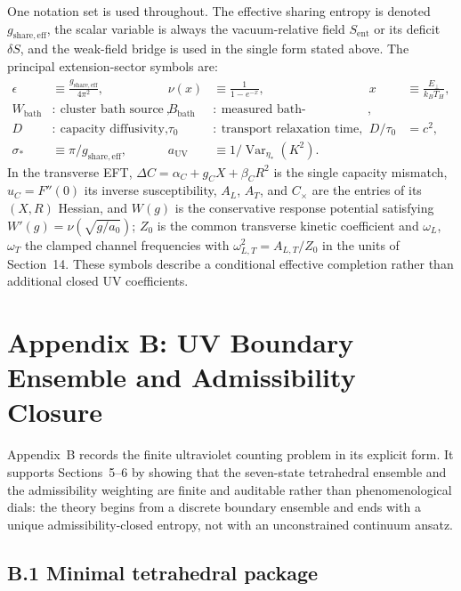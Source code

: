 \documentclass[11pt]{article}
\begin{document}
One notation set is used throughout. The effective sharing entropy is denoted $g_{\mathrm{share,eff}}$, the scalar variable is always the vacuum-relative field $S_{\mathrm{ent}}$ or its deficit $\delta S$, and the weak-field bridge is used in the single form stated above. The principal extension-sector symbols are:
\begin{align*}
\epsilon&\equiv \frac{g_{\mathrm{share,eff}}}{4\pi^2},
&\nu(x)&\equiv \frac{1}{1-e^{-x}},
&x&\equiv \frac{E_\perp}{k_BT_H},\\
W_{\mathrm{bath}}&:\ \text{cluster bath source weight},
&B_{\mathrm{bath}}&:\ \text{measured bath-development fraction},\\
D&:\ \text{capacity diffusivity},
&\tau_0&:\ \text{transport relaxation time},
&D/\tau_0&=c^2,\\
\sigma_*&\equiv \pi/g_{\mathrm{share,eff}},
&a_{\mathrm{UV}}&\equiv 1/\operatorname{Var}_{\eta_*}(K^2).
\end{align*}
In the transverse EFT, $\Delta C=\alpha_C+g_CX+\beta_CR^2$ is the single capacity mismatch, $u_C=F''(0)$ its inverse susceptibility, $A_L$, $A_T$, and $C_\times$ are the entries of its $(X,R)$ Hessian, and $W(g)$ is the conservative response potential satisfying $W'(g)=\nu(\sqrt{g/a_0})$; $Z_0$ is the common transverse kinetic coefficient and $\omega_L$, $\omega_T$ the clamped channel frequencies with $\omega_{L,T}^2=A_{L,T}/Z_0$ in the units of Section~14. These symbols describe a conditional effective completion rather than additional closed UV coefficients.

\section*{Appendix B: UV Boundary Ensemble and Admissibility Closure}

Appendix~B records the finite ultraviolet counting problem in its explicit form. It supports Sections~5--6 by showing that the seven-state tetrahedral ensemble and the admissibility weighting are finite and auditable rather than phenomenological dials: the theory begins from a discrete boundary ensemble and ends with a unique admissibility-closed entropy, not with an unconstrained continuum ansatz.

\subsection*{B.1 Minimal tetrahedral package}
\end{document}
